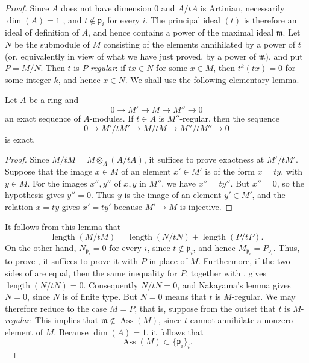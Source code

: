 
\begin{proof}
Since $A$ does not have dimension $0$ and $A/tA$ is Artinian, necessarily $\dim(A)=1$ , and $t\notin\mathfrak p_i$ for every $i$.
The principal ideal $(t)$ is therefore an ideal of definition of $A$, and hence contains a power of the maximal ideal $\mathfrak m$.
Let $N$ be the submodule of $M$ consisting of the elements annihilated by a power of $t$ (or, equivalently in view of what we have just proved, by a power of $\mathfrak m$), and put $P=M/N$.
Then $t$ is $P$-\emph{regular}: if $tx\in N$ for some $x\in M$, then $t^k(tx)=0$ for some integer $k$, and hence $x\in N$.
We shall use the following elementary lemma.

\begin{lemma}[3.4.1.4]
\label{IV.3.4.1.4}
Let $A$ be a ring and
\[
0\longrightarrow M'\longrightarrow M\longrightarrow M''\longrightarrow 0
\]
an exact sequence of $A$-modules.
If $t\in A$ is $M''$-regular, then the sequence
\[
0\longrightarrow M'/tM'
 \longrightarrow M/tM
 \longrightarrow M''/tM''
 \longrightarrow 0
\]
is exact.
\end{lemma}

\begin{proof}
Since $M/tM=M\otimes_A(A/tA)$, it suffices to prove exactness at $M'/tM'$.
Suppose that the image $x\in M$ of an element $x'\in M'$ is of the form $x=ty$, with $y\in M$.
For the images $x'',y''$ of $x,y$ in $M''$, we have $x''=ty''$.
But $x''=0$, so the hypothesis gives $y''=0$.
Thus $y$ is the image of an element $y'\in M'$, and the relation $x=ty$ gives $x'=ty'$ because $M'\to M$ is injective.
\end{proof}

It follows from this lemma that
\[
\label{IV.3.4.1.5}
\operatorname{length}(M/tM)
  =
  \operatorname{length}(N/tN)
  +
  \operatorname{length}(P/tP).
\tag{3.4.1.5}
\]
On the other hand, $N_{\mathfrak p_i}=0$ for every $i$, since $t\notin\mathfrak p_i$, and hence $M_{\mathfrak p_i}=P_{\mathfrak p_i}$.
Thus, to prove , it suffices to prove it with $P$ in place of $M$.
Furthermore, if the two sides of  are equal, then the same inequality for $P$, together with , gives $\operatorname{length}(N/tN)=0$.
Consequently $N/tN=0$, and Nakayama's lemma gives $N=0$, since $N$ is of finite type.
But $N=0$ means that $t$ is $M$-regular.
We may therefore reduce to the case $M=P$, that is, suppose from the outset that $t$ is $M$-\emph{regular}.
This implies that $\mathfrak m\notin\operatorname{Ass}(M)$, since $t$ cannot annihilate a nonzero element of $M$.
Because $\dim(A)=1$, it follows that
\[
\operatorname{Ass}(M)\subset\{\mathfrak p_i\}_i.
\]


\end{proof}
